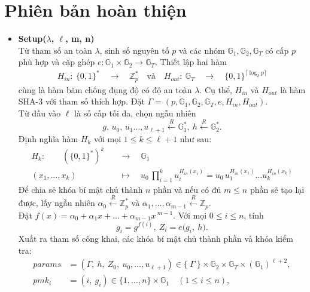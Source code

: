\documentclass[class=report, crop=false]{standalone}
\begin{document}
	\section{Phiên bản hoàn thiện}
		\begin{itemize}[leftmargin=1cm, itemindent=-1cm]
			\item[] {\sffamily\bfseries Setup($\lambda$, $\ell$, m, n)} \\
			Từ tham số an toàn $\lambda$, sinh số nguyên tố $p$ và các nhóm $\mathbb{G}_1, \mathbb{G}_2, \mathbb{G}_T$ có cấp $p$ phù hợp và cặp ghép $e: \mathbb{G}_1 \times \mathbb{G}_2 \rightarrow \mathbb{G}_T$. Thiết lập hai hàm
			\begin{align*}
				H_{in}: 	\ \{0, 1 \}^* 	\quad \rightarrow \quad \mathbb{Z}_p^* 						\quad \text{và}\quad
				H_{out}: 	\ \mathbb{G}_T 	\quad \rightarrow \quad \{0, 1 \}^{\lceil \log_2 p \rceil}
			\end{align*}
			cùng là hàm băm chống đụng độ có độ an toàn $\lambda$. Cụ thể, $H_{in}$ và $H_{out}$ là hàm SHA-3 với tham số thích hợp. Đặt $\Gamma = (p, \mathbb{G}_1, \mathbb{G}_2, \mathbb{G}_T, e, H_{in}, H_{out})$. \\
			Từ đầu vào $\ell$ là số cấp tối đa, chọn ngẫu nhiên
			\[
				g,\, u_0,\, u_1 \dots, u_{\ell + 1} \xleftarrow{R} \mathbb{G}_1^*,\ h \xleftarrow{R} \mathbb{G}_2^*.
			\]
			Định nghĩa hàm $H_k$ với mọi $1 \leq k \leq \ell + 1$ như sau:
			\begin{align*}
				H_k:\quad\quad 	(\{0, 1 \}^*)^k 	\quad	 &\rightarrow 	\quad  	\mathbb{G}_1 \\
								(x_1, \dots, x_k) 	\quad	 &\mapsto 		\quad  	u_0 \, \prod_{i = 1}^k u_i^{H_{in}(x_i)} = u_0 \, u_1^{H_{in}(x_1)}\dots u_k^{H_{in}(x_k)}
			\end{align*}
			Để chia sẻ khóa bí mật chủ thành $n$ phần và nếu có đủ $m \leq n$ phần sẽ tạo lại được, lấy ngẫu nhiên $\alpha_0 \xleftarrow{R} \mathbb{Z}_p^*$ và $\alpha_1, \dots, \alpha_{m - 1} \xleftarrow{R} \mathbb{Z}_p$. \\
			Đặt $f(x) = \alpha_0 + \alpha_1x + \dots + \alpha_{m - 1}x\,^{m - 1}$. Với mọi $0 \leq i \leq n$, tính
			\[
				g_i = g^{f(i)},\ Z_i = e \Big(g_i,\ h \Big).
			\]
			Xuất ra tham số công khai, các khóa bí mật chủ thành phần và khóa kiểm tra:
			\begin{align*}
				params &= (\Gamma,\ h,\ Z_0,\ u_0, \dots, u_{\ell + 1}) \in \{\ \Gamma \ \} \times \mathbb{G}_2 \times \mathbb{G}_T \times (\mathbb{G}_1)^{\ell + 2}, \\
				pmk_i &= (i,\ g_i) \in \{1, \dots, n \} \times \mathbb{G}_1 \quad (1 \leq i \leq n), \\

\end{align*}
\end{itemize}
\end{document}
